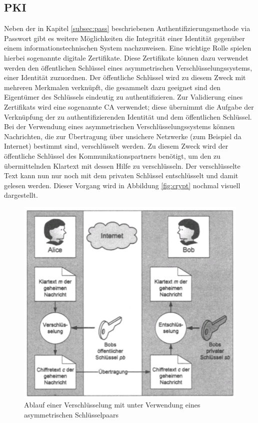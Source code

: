 \documentclass[
book,
a4paper,   
titlepage,  
halfparskip,
12pt        
]{scrartcl}
\begin{document}
\begin{onehalfspacing}
\subsection{\ac{PKI}}
\label{subsec:zert}
Neben der in Kapitel \vref{subsec:pass} beschriebenen Authentifizierungsmethode via Passwort gibt es weitere Möglichkeiten die Integrität einer Identität gegenüber einem informationstechnischen System nachzuweisen. Eine wichtige Rolle spielen hierbei sogenannte digitale Zertifikate. Diese Zertifikate können dazu verwendet werden den öffentlichen Schlüssel eines asymmetrischen Verschlüsselungssystems, einer Identität zuzuordnen. Der öffentliche Schlüssel wird zu diesem Zweck mit mehreren Merkmalen verknüpft, die gesammelt dazu geeignet sind den Eigentümer des Schlüssels eindeutig zu authentifizieren. Zur Validierung eines Zertifikats wird eine sogenannte \ac{CA} verwendet; diese übernimmt die Aufgabe der Verknüpfung der zu authentifizierenden Identität und dem öffentlichen Schlüssel.\cite[S. 145f]{kerberos2}\newline
Bei der Verwendung eines asymmetrischen Verschlüsselungssystems können Nachrichten, die zur Übertragung über unsichere Netzwerke (zum Beispiel da Internet) bestimmt sind, verschlüsselt werden. Zu diesem Zweck wird der öffentliche Schlüssel des Kommunikationspartners benötigt, um den zu übermittelnden Klartext mit dessen Hilfe zu verschlüsseln. Der verschlüsselte Text kann nun nur noch mit dem privaten Schlüssel entschlüsselt und damit gelesen werden. Dieser Vorgang wird in Abbildung \vref{fig:crypt} nochmal visuell dargestellt.\cite[S. 5]{crypto}
\begin{figure}[h]
	\centering
	\includegraphics[width=0.6\linewidth]{crypt.png}
	\caption[Ablauf Verslüsselung]{Ablauf einer Verschlüsselung mit unter Verwendung eines asymmetrischen Schlüsselpaars\cite[S. 6]{crypto}}
	\label{fig:crypt}
\end{figure}

\end{onehalfspacing}
\end{document}
